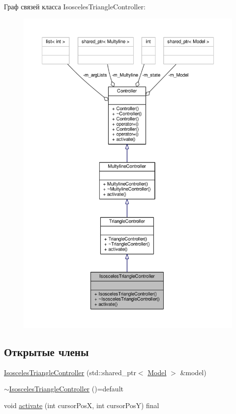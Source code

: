Граф связей класса Isosceles\-Triangle\-Controller\-:
\nopagebreak
\begin{figure}[H]
\begin{center}
\leavevmode
\includegraphics[width=350pt]{class_isosceles_triangle_controller__coll__graph}
\end{center}
\end{figure}
\subsection*{Открытые члены}
\begin{DoxyCompactItemize}
\item 
\hyperlink{class_isosceles_triangle_controller_ad8bf1a8c726e6b4279be064a4875062e}{Isosceles\-Triangle\-Controller} (std\-::shared\-\_\-ptr$<$ \hyperlink{class_model}{Model} $>$ \&model)
\item 
\hyperlink{class_isosceles_triangle_controller_a54ec5774792ce310505e4d3ea48d3ce9}{$\sim$\-Isosceles\-Triangle\-Controller} ()=default
\item 
void \hyperlink{class_isosceles_triangle_controller_ac060b7bdfdc3c5fc078147e14e31415b}{activate} (int cursor\-Pos\-X, int cursor\-Pos\-Y) final
\end{DoxyCompactItemize}


